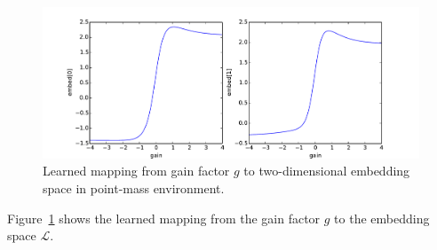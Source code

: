 \documentclass{article}
\newcommand{\TODO}[1]{}
\newcommand{\cL}{\mathcal{L}}
\newcommand{\blind}{\emph{blind}}
\newcommand{\plain}{\emph{plain}}
\newcommand{\extra}{\emph{extra}}
\newcommand{\embed}{\emph{embed}}
\begin{document}

\begin{figure}
\centering
\includegraphics[width=\textwidth]{pointmass_embed_mapping.pdf}
\caption{
Learned mapping from gain factor $g$ to two-dimensional embedding space in point-mass environment.
}
\label{fig:embed-mapping}
\end{figure}
Figure~\ref{fig:embed-mapping} shows the learned mapping from the gain factor $g$
to the embedding space $\cL$.
\TODO{interpret.}
\end{document}
